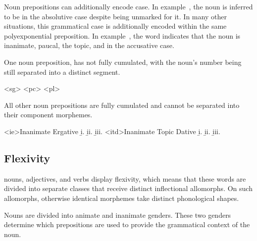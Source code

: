 Noun prepositions can additionally encode case. In example~, the noun   is inferred to be in the absolutive case despite being unmarked for it. In many other situations, this grammatical case is additionally encoded within the same polyexponential preposition. In example~, the word   indicates that the noun  is inanimate, paucal, the topic, and in the accusative case.

One noun preposition,   has not fully cumulated, with the noun's number being still separated into a distinct segment.

	\a<sg>   
	\a<pc>   
	\a<pl>   
\xe

All other noun prepositions are fully cumulated and cannot be separated into their component morphemes.

	\a<ie>Inanimate Ergative
	\beginsubsub
		\b{i.}   
		\b{ii.}   
		\b{iii.}   
	\endsubsub
	\a<itd>Inanimate Topic Dative
	\beginsubsub
		\b{i.}   
		\b{ii.}   
		\b{iii.}   
	\endsubsub
\xe


\subsection{Flexivity}
\label{subsec:tvk-flexivity}

\langtvk{} nouns, adjectives, and verbs display flexivity, which means that these words are divided into separate classes that receive distinct inflectional allomorphs. On such allomorphs, otherwise identical morphemes take distinct phonological shapes.

Nouns are divided into animate and inanimate genders. These two genders determine which prepositions are used to provide the grammatical context of the noun.

